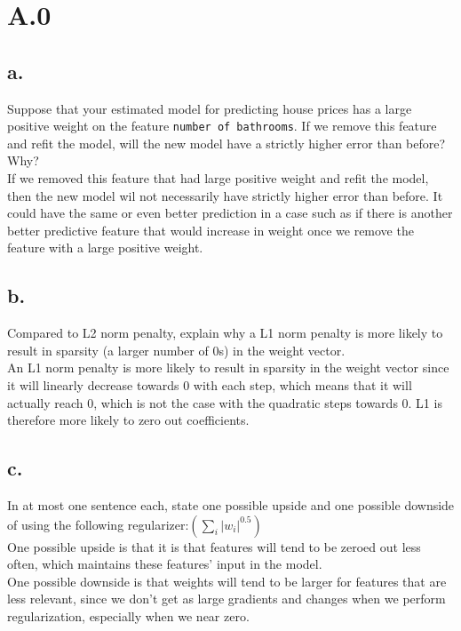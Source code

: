\documentclass{article}
\date{{}}
\newcommand{\1}{\mathbf{1}}
\begin{document}
\thispagestyle{firstpageheader}

\section*{A.0}
{\Large 

\subsection*{a.}

Suppose that your estimated model for predicting house prices has a large positive weight on the feature \texttt{number of bathrooms}. If we remove this feature and refit the model, will the new model have a strictly higher error than before? Why? \\

If we removed this feature that had large positive weight and refit the model, then the new model wil not necessarily have strictly higher error than before. It could have the same or even better prediction in a case such as if there is another better predictive feature that would increase in weight once we remove the feature with a large positive weight.

\subsection*{b.}

Compared to L2 norm penalty, explain why a L1 norm penalty is more likely to result in sparsity (a larger number of 0s) in the weight vector. \\

An L1 norm penalty is more likely to result in sparsity in the weight vector since it will linearly decrease towards 0 with each step, which means that it will actually reach 0, which is not the case with the quadratic steps towards 0. L1 is therefore more likely to zero out coefficients.

\subsection*{c.}

In at most one sentence each, state one possible upside and one possible downside of using the following regularizer:$\left(\sum_{i}\left|w_{i}\right|^{0.5}\right)$ \\

One possible upside is that it is that features will tend to be zeroed out less often, which maintains these features' input in the model. \\ 
One possible downside is that weights will tend to be larger for features that are less relevant, since we don't get as large gradients and changes when we perform regularization, especially when we near zero.

}
\end{document}
